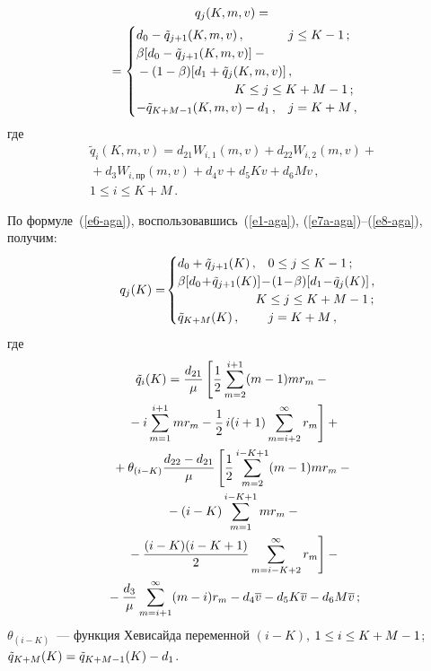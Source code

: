 \begin{multicols}{2}
\begin{multline}
q_j(K,m,v)={}\\
{}=\begin{cases}
d_0-\tilde{q}_{j+1}(K,m,v)\,, &j\leq K-1\,;\\
\beta[d_0-\tilde{q}_{j+1}(K,m,v)]-{}&\\
{}-(1-\beta) [d_1+\tilde{q}_j(K,m,v)]\,,\hspace*{-18mm} &\\
& \hspace*{-15mm}K\leq j\leq K+M-1\,;\\
-\tilde{q}_{K+M-1}(K,m,v)-d_1\,, & j=K+M\,,
\end{cases}
\label{e8-aga}
\end{multline}
где 
\begin{multline*}
\tilde{q}_i(K,m,v)=d_{21}W_{i,1}(m,v)+d_{22}W_{i,2}(m,v)+{}\\
{}+d_3W_{i,\mathrm{пр
}}(m,v)+d_4 v +d_5 K v +d_6 M v\,,\\  1\leq i\leq K+M\,.
\end{multline*}
  
  По формуле~(\ref{e6-aga}), воспользовавшись~(\ref{e1-aga}), 
(\ref{e7a-aga})--(\ref{e8-aga}), получим:
  \begin{equation}
 \!\, q_j(K)=\!\begin{cases}
  d_0+\tilde{q}_{j+1}(K)\,,& 0\leq j\leq K-1\,;\\
  \beta[d_0\!+\!\tilde{q}_{j+1}(K)]\!-\!(1\!-\!\beta)[d_1\!-\!\tilde{q}_j(K)]\,,\hspace*{-120pt}\\
   & \hspace*{-10pt}K\leq j\leq K+M-1\,;\\
  \tilde{q}_{K+M}(K)\,,& j=K+M\,,
  \end{cases}\!\!
  \hspace*{-20pt}\label{e9-aga}
  \end{equation}
  где 
  \begin{multline}
  \tilde{q}_i(K)=\displaystyle\frac{\displaystyle d_{21}\mathstrut}{\displaystyle \mu\mathstrut} \left[ \displaystyle\frac{\displaystyle 1\mathstrut}{\displaystyle 2\mathstrut}\sum\limits_{m=2}^{i+1} (m-1) 
mr_m -{}\right.\\
\left.{}- i \sum\limits_{m=1}^{i+1} m r_m-
\displaystyle\frac{\displaystyle 1\mathstrut}{\displaystyle 2\mathstrut}\,i(i+1)\sum\limits^\infty_{m=i+2} r_m\right]+{}\\
  {}+\theta_{(i-K)}\displaystyle\frac{\displaystyle d_{22}-d_{21}\mathstrut}{\displaystyle \mu\mathstrut} \left[ 
\displaystyle\frac{\displaystyle 1\mathstrut}{\displaystyle 2\mathstrut}\sum\limits_{m=2}^{i-K+1} (m-1) m r_m-{}\right.\\
{}-(i-K)\sum\limits_{m=1}^{i- K+1} m r_m-{}\\
  \left.{}- \displaystyle\frac{\displaystyle (i-K)(i-K+1)\mathstrut}{\displaystyle 2\mathstrut}\sum\limits^\infty_{m=i-K+2} r_m\right] -{}\\
{}-
\displaystyle\frac{\displaystyle d_3\mathstrut}{\displaystyle \mu\mathstrut} \sum\limits^\infty_{m=i+1} (m-i) r_m-d_4\overline{v} -d_5 K 
\overline{v} -d_6 M \overline{v}\,;
  \label{e10-aga}
  \end{multline}
$\theta_{(i-K)}$~--- функция Хевисайда переменной $(i-K)$, $1\hm\leq i\hm\leq 
K\hm+M\hm-1$; $\tilde{q}_{K+M}(K)\hm= \tilde{q}_{K+M-1}(K) \hm- d_1$.
  

\end{multicols}
